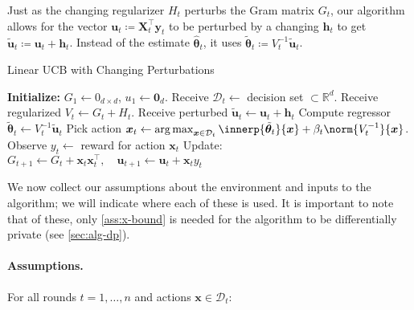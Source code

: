 \documentclass{article}
\renewcommand{\vec}[1]{\bm{#1}}
\newcommand{\defeq}{\coloneq}
\newcommand{\inv}[1]{#1^{-1}}
\newcommand{\Real}{\mathds{R}}
\DeclareMathOperator*{\argmax}{arg\,max}
\newcommand\given[1][\delimsize]{%
  \providecommand{\delimsize}{}
  \nonscript\:#1\vert\allowbreak\nonscript\:\mathopen{}
}
\DeclarePairedDelimiter{\abs}||
\providecommand\transp{\top}
\let\transpsymbol\transp
\renewcommand{\transp}[1]{#1^\transpsymbol}
\newcommand{\Dset}[1]{\mathcal{D}_{#1}}
\begin{document}
Just as the changing regularizer $H_t$ perturbs the Gram matrix $G_t$,
our algorithm allows for the vector
$\vec u_t \defeq \transp{\vec X_t} \vec y_t$ to be perturbed by a
changing $\vec h_t$ to get
$\tilde{\vec u}_t \defeq \vec u_t + \vec h_t$.  Instead of the
estimate $\hat{\vec\theta}_t$, it uses
$\tilde{\vec\theta}_t \defeq \inv{V_t}\tilde{\vec u}_t$.

\begin{algorithm}
  \caption{Linear UCB with Changing Perturbations}\label{alg:linucb}
  \begin{algorithmic}
    \State \textbf{Initialize:} $G_1 \gets 0_{d\times d}$,
    $u_1\gets \vec 0_{d}$.
    \State Receive $\Dset{t} \gets{}$ decision set ${} \subset \Real^d$.
    \State Receive regularized $V_t \gets G_t + H_t$.
    \State Receive perturbed $\tilde{\vec u}_t \gets \vec u_t + \vec h_t$
    \State Compute regressor $\tilde{\vec\theta}_{t} \gets \inv{V_{t}}\tilde{\vec u}_{t}$
    \State Pick action $\vec x_t \gets \argmax_{\vec x\in\Dset{t}}
    \innerp{\tilde{\vec \theta}_t}{\vec x} +
    \beta_t\norm{\inv{V_t}}{\vec x}$.
    \State Observe $y_t \gets {}$ reward for action $\vec x_t$
    \State Update: $G_{t+1} \gets G_{t} + \vec x_t \transp{\vec x_t},
    \quad \vec u_{t+1} \gets \vec u_{t} + \vec x_t y_t$
    \EndFor
  \end{algorithmic}
\end{algorithm}

We now collect our assumptions about the environment and inputs to the
algorithm; we will indicate where each of these is used.  It is
important to note that of these, only \cref{ass:x-bound} is needed for
the algorithm to be differentially private (see \cref{sec:alg-dp}).

\paragraph*{Assumptions.}
For all rounds $t=1,\dotsc,n$ and actions $\vec x\in\Dset{t}$:
\end{document}
